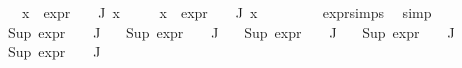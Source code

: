 \begin{isabellebody}
\ \ \ {\isachardoublequoteopen}{\isasymforall}x\ {\isasymin}\ {\isacharparenleft}{\kern0pt}{\isacharparenleft}{\kern0pt}expr{\isacharunderscore}{\kern0pt}{}\ {\isasymcirc}\ {\isasymPhi}{\isacharparenright}{\kern0pt}\ {\isacharbackquote}{\kern0pt}\ J{\isacharparenright}{\kern0pt}{\isachardot}{\kern0pt}\ x\ {\isasymle}\ {}{\isachardoublequoteclose}\isanewline
\ \ \ {\isachardoublequoteopen}{\isasymforall}x\ {\isasymin}\ {\isacharparenleft}{\kern0pt}{\isacharparenleft}{\kern0pt}expr{\isacharunderscore}{\kern0pt}{}\ {\isasymcirc}\ {\isasymPhi}{\isacharparenright}{\kern0pt}\ {\isacharbackquote}{\kern0pt}\ J{\isacharparenright}{\kern0pt}{\isachardot}{\kern0pt}\ x\ {\isasymle}\ \ {}{\isachardoublequoteclose}\isanewline
\ \ \ \ \isamarkupfalse%
\ expr{\isachardot}{\kern0pt}simps\ \isamarkupfalse%
\ simp{\isacharplus}{\kern0pt}\isanewline
\isanewline
\isanewline
\ \ \isamarkupfalse%
\ {\isachardoublequoteopen}Sup\ {\isacharparenleft}{\kern0pt}{\isacharparenleft}{\kern0pt}expr{\isacharunderscore}{\kern0pt}{}\ {\isasymcirc}\ {\isasymPhi}{\isacharparenright}{\kern0pt}\ {\isacharbackquote}{\kern0pt}\ J{\isacharparenright}{\kern0pt}\ {\isasymle}\ {}{\isachardoublequoteclose}\isanewline
{}\ {\isachardoublequoteopen}Sup\ {\isacharparenleft}{\kern0pt}{\isacharparenleft}{\kern0pt}expr{\isacharunderscore}{\kern0pt}{}\ {\isasymcirc}\ {\isasymPhi}{\isacharparenright}{\kern0pt}\ {\isacharbackquote}{\kern0pt}\ J{\isacharparenright}{\kern0pt}\ {\isasymle}\ {}{\isachardoublequoteclose}\isanewline
{}\ {\isachardoublequoteopen}Sup\ {\isacharparenleft}{\kern0pt}{\isacharparenleft}{\kern0pt}expr{\isacharunderscore}{\kern0pt}{}\ {\isasymcirc}\ {\isasymPhi}{\isacharparenright}{\kern0pt}\ {\isacharbackquote}{\kern0pt}\ J{\isacharparenright}{\kern0pt}\ {\isasymle}\ {}{\isachardoublequoteclose}\isanewline
{}\ {\isachardoublequoteopen}Sup\ {\isacharparenleft}{\kern0pt}{\isacharparenleft}{\kern0pt}expr{\isacharunderscore}{\kern0pt}{}\ {\isasymcirc}\ {\isasymPhi}{\isacharparenright}{\kern0pt}\ {\isacharbackquote}{\kern0pt}\ J{\isacharparenright}{\kern0pt}\ {\isasymle}\ {}{\isachardoublequoteclose}\isanewline
{}\ {\isachardoublequoteopen}Sup\ {\isacharparenleft}{\kern0pt}{\isacharparenleft}{\kern0pt}expr{\isacharunderscore}{\kern0pt}{}\ {\isasymcirc}\ {\isasymPhi}{\isacharparenright}{\kern0pt}\ {\isacharbackquote}{\kern0pt}\ J{\isacharparenright}{\kern0pt}\ {\isasymle}\ {}{\isachardoublequoteclose}\isanewline

\end{isabellebody}
